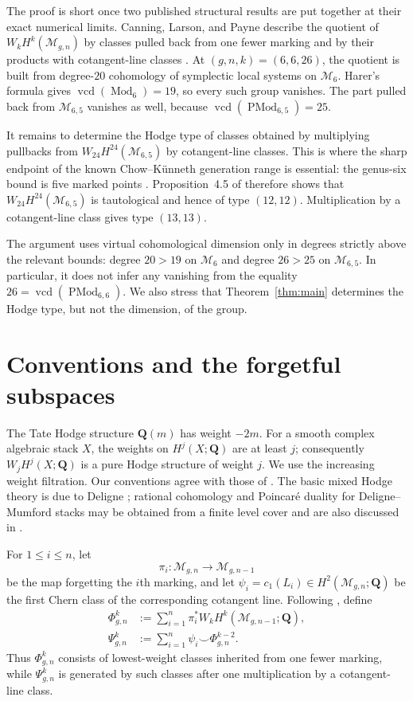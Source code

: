 \documentclass[11pt,reqno]{amsart}
\newcommand{\Q}{\mathbf{Q}}
\newcommand{\M}{\mathcal{M}}
\newcommand{\Mod}{\operatorname{Mod}}
\newcommand{\PMod}{\operatorname{PMod}}
\newcommand{\vcd}{\operatorname{vcd}}
\theoremstyle{definition}
\theoremstyle{remark}
\begin{document}
The proof is short once two published structural results are put together at
their exact numerical limits.  Canning, Larson, and Payne describe the
quotient of $W_kH^k(\M_{g,n})$ by classes pulled back from one fewer marking
and by their products with cotangent-line classes
\cite[Lemma~3.1]{CanningLarsonPayne}.  At $(g,n,k)=(6,6,26)$, the quotient is
built from degree-$20$ cohomology of symplectic local systems on $\M_6$.
Harer's formula gives $\vcd(\Mod_6)=19$, so every such group vanishes.  The
part pulled back from $\M_{6,5}$ vanishes as well, because
$\vcd(\PMod_{6,5})=25$.

It remains to determine the Hodge type of classes obtained by multiplying
pullbacks from $W_{24}H^{24}(\M_{6,5})$ by cotangent-line classes.  This is
where the sharp endpoint of the known Chow--K\"unneth generation range is
essential: the genus-six bound is five marked points
\cite[Table~1]{CanningLarsonPayne}.  Proposition~4.5 of
\cite{CanningLarsonPayne} therefore shows that
$W_{24}H^{24}(\M_{6,5})$ is tautological and hence of type $(12,12)$.
Multiplication by a cotangent-line class gives type $(13,13)$.

The argument uses virtual cohomological dimension only in degrees strictly
above the relevant bounds: degree $20>19$ on $\M_6$ and degree $26>25$ on
$\M_{6,5}$.  In particular, it does not infer any vanishing from the equality
$26=\vcd(\PMod_{6,6})$.  We also stress that Theorem~\ref{thm:main} determines
the Hodge type, but not the dimension, of the group.

\section{Conventions and the forgetful subspaces}

The Tate Hodge structure $\Q(m)$ has weight $-2m$.  For a smooth complex
algebraic stack $X$, the weights on $H^j(X;\Q)$ are at least $j$; consequently
$W_jH^j(X;\Q)$ is a pure Hodge structure of weight $j$.  We use the increasing
weight filtration.  Our conventions agree with those of
\cite{CanningLarsonPayne}.  The basic mixed Hodge theory is due to Deligne
\cite{DeligneHodgeII}; rational cohomology and Poincar\'e duality for
Deligne--Mumford stacks may be obtained from a finite level cover and are also
discussed in \cite{BehrendStacks}.

For $1\leq i\leq n$, let
\[
  \pi_i\colon \M_{g,n}\longrightarrow \M_{g,n-1}
\]
be the map forgetting the $i$th marking, and let
$\psi_i=c_1(L_i)\in H^2(\M_{g,n};\Q)$ be the first Chern class of the
corresponding cotangent line.  Following \cite[Sections~2--3]
{CanningLarsonPayne}, define
\begin{align}
  \Phi^k_{g,n}
    &:=\sum_{i=1}^n
      \pi_i^*W_kH^k(\M_{g,n-1};\Q),\label{eq:Phi}\\
  \Psi^k_{g,n}
    &:=\sum_{i=1}^n \psi_i\smile\Phi^{k-2}_{g,n}.
      \label{eq:Psi}
\end{align}
Thus $\Phi^k_{g,n}$ consists of lowest-weight classes inherited from one
fewer marking, while $\Psi^k_{g,n}$ is generated by such classes after one
multiplication by a cotangent-line class.
\end{document}
